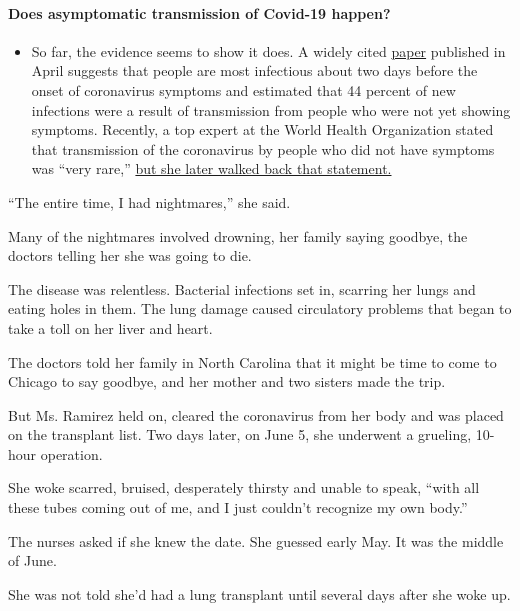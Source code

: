 \begin{itemize}
{  \paragraph{Does asymptomatic transmission of Covid-19
  happen?}\label{does-asymptomatic-transmission-of-covid-19-happen}}

  \begin{itemize}
  \tightlist
  \item
    So far, the evidence seems to show it does. A widely cited
    \href{https://www.nature.com/articles/s41591-020-0869-5}{paper}
    published in April suggests that people are most infectious about
    two days before the onset of coronavirus symptoms and estimated that
    44 percent of new infections were a result of transmission from
    people who were not yet showing symptoms. Recently, a top expert at
    the World Health Organization stated that transmission of the
    coronavirus by people who did not have symptoms was ``very rare,''
    \href{https://www.nytimes.com/2020/06/09/world/coronavirus-updates.html?action=click\&pgtype=Article\&state=default\&region=MAIN_CONTENT_3\&context=storylines_faq\#link-1f302e21}{but
    she later walked back that statement.}
  \end{itemize}
\end{itemize}

``The entire time, I had nightmares,'' she said.

Many of the nightmares involved drowning, her family saying goodbye, the
doctors telling her she was going to die.

The disease was relentless. Bacterial infections set in, scarring her
lungs and eating holes in them. The lung damage caused circulatory
problems that began to take a toll on her liver and heart.

The doctors told her family in North Carolina that it might be time to
come to Chicago to say goodbye, and her mother and two sisters made the
trip.

But Ms. Ramirez held on, cleared the coronavirus from her body and was
placed on the transplant list. Two days later, on June 5, she underwent
a grueling, 10-hour operation.

She woke scarred, bruised, desperately thirsty and unable to speak,
``with all these tubes coming out of me, and I just couldn't recognize
my own body.''

The nurses asked if she knew the date. She guessed early May. It was the
middle of June.

She was not told she'd had a lung transplant until several days after
she woke up.

